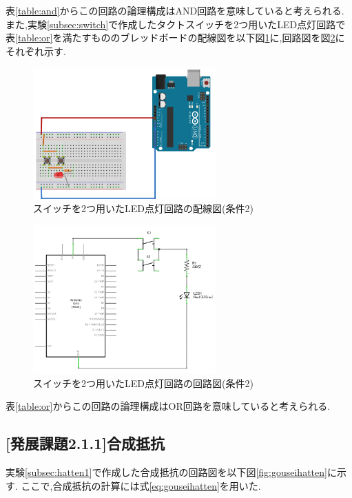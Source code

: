 \documentclass{jarticle}
\begin{document}
表\ref{table:and}からこの回路の論理構成はAND回路を意味していると考えられる.\\
また,実験\ref{subsec:switch}で作成したタクトスイッチを2つ用いたLED点灯回路で表\ref{table:or}を満たすもののブレッドボードの配線図を以下図\ref{fig:2-1-7-or-bread}に,回路図を図\ref{fig:2-1-7-or-kairo}にそれぞれ示す.

\begin{figure}[H]
\begin{center}
\includegraphics[width=7.0cm]{images/kadai2-1-7-OR_ブレッドボード.png}
\caption{スイッチを2つ用いたLED点灯回路の配線図(条件2)}
\label{fig:2-1-7-or-bread}
\end{center}
\end{figure}

\begin{figure}[H]
\begin{center}
\includegraphics[width=7.0cm]{images/kadai2-1-7-OR_回路図.png}
\caption{スイッチを2つ用いたLED点灯回路の回路図(条件2)}
\label{fig:2-1-7-or-kairo}
\end{center}
\end{figure}

表\ref{table:or}からこの回路の論理構成はOR回路を意味していると考えられる.
\subsection{[発展課題2.1.1]合成抵抗}
実験\ref{subsec:hatten1}で作成した合成抵抗の回路図を以下図\ref{fig:gouseihatten}に示す.
ここで,合成抵抗の計算には式\ref{eq:gouseihatten}を用いた.
\end{document}
